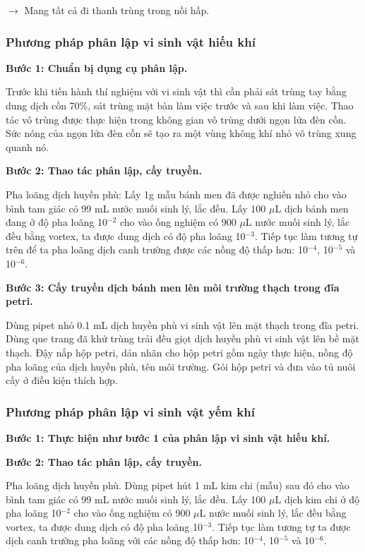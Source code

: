 $\rightarrow$ Mang tất cả đi thanh trùng trong nồi hấp.

\subsubsection{Phương pháp phân lập vi sinh vật hiếu khí}

\textbf{Bước 1: Chuẩn bị dụng cụ phân lập.}

Trước khi tiến hành thí nghiệm với vi sinh vật thì cần phải sát trùng tay bằng dung dịch cồn 70\%, sát trùng mặt bàn làm việc trước và sau khi làm việc. Thao tác vô trùng được thực hiện trong không gian vô trùng dưới ngọn lửa đèn cồn. Sức nóng của ngọn lửa đèn cồn sẽ tạo ra một vùng không khí nhỏ vô trùng xung quanh nó.

\textbf{Bước 2: Thao tác phân lập, cấy truyền.}

Pha loãng dịch huyền phù: Lấy 1g mẫu bánh men đã được nghiền nhỏ cho vào bình tam giác có 99 mL nước muối sinh lý, lắc đều. Lấy 100 $\mu$L dịch bánh men đang ở độ pha loãng 10$^{-2}$ cho vào ống nghiệm có 900 $\mu$L nước muối sinh lý, lắc đều bằng vortex, ta được dung dịch có độ pha loãng 10$^{-3}$. Tiếp tục làm tương tự trên để ta pha loãng dịch canh trường được các nồng độ thấp hơn: 10$^{-4}$, 10$^{-5}$ và 10$^{-6}$.

\textbf{Bước 3: Cấy truyền dịch bánh men lên môi trường thạch trong đĩa petri.}

Dùng pipet nhỏ 0.1 mL dịch huyền phù vi sinh vật lên mặt thạch trong đĩa petri. Dùng que trang đã khử trùng trải đều giọt dịch huyền phù vi sinh vật lên bề mặt thạch. Đậy nắp hộp petri, dán nhãn cho hộp petri gồm ngày thực hiện, nồng độ pha loãng của dịch huyền phù, tên môi trường. Gói hộp petri và đưa vào tủ nuôi cấy ở điều kiện thích hợp.

\subsubsection{Phương pháp phân lập vi sinh vật yếm khí}

\textbf{Bước 1: Thực hiện như bước 1 của phân lập vi sinh vật hiếu khí.}

\textbf{Bước 2: Thao tác phân lập, cấy truyền.}

Pha loãng dịch huyền phù. Dùng pipet hút 1 mL kim chi (mẫu) sau đó cho vào bình tam giác có 99 mL nước muối sinh lý, lắc đều. Lấy 100 $\mu$L dịch kim chi ở độ pha loãng 10$^{-2}$ cho vào ống nghiệm có 900 $\mu$L nước muối sinh lý, lắc đều bằng vortex, ta được dung dịch có độ pha loãng 10$^{-3}$. Tiếp tục làm tương tự ta được dịch canh trường pha loãng với các nồng độ thấp hơn: 10$^{-4}$, 10$^{-5}$ và 10$^{-6}$.

